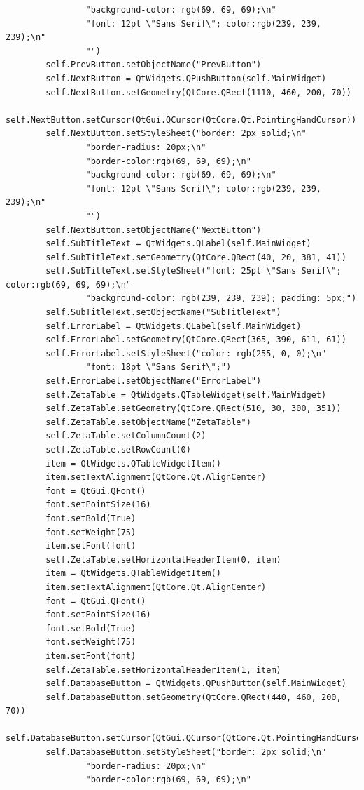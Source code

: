 \documentclass{article}
\begin{document}
\begin{lstlisting}
                "background-color: rgb(69, 69, 69);\n"
                "font: 12pt \"Sans Serif\"; color:rgb(239, 239, 239);\n"
                "")
        self.PrevButton.setObjectName("PrevButton")
        self.NextButton = QtWidgets.QPushButton(self.MainWidget)
        self.NextButton.setGeometry(QtCore.QRect(1110, 460, 200, 70))
        self.NextButton.setCursor(QtGui.QCursor(QtCore.Qt.PointingHandCursor))
        self.NextButton.setStyleSheet("border: 2px solid;\n"
                "border-radius: 20px;\n"
                "border-color:rgb(69, 69, 69);\n"
                "background-color: rgb(69, 69, 69);\n"
                "font: 12pt \"Sans Serif\"; color:rgb(239, 239, 239);\n"
                "")
        self.NextButton.setObjectName("NextButton")
        self.SubTitleText = QtWidgets.QLabel(self.MainWidget)
        self.SubTitleText.setGeometry(QtCore.QRect(40, 20, 381, 41))
        self.SubTitleText.setStyleSheet("font: 25pt \"Sans Serif\"; color:rgb(69, 69, 69);\n"
                "background-color: rgb(239, 239, 239); padding: 5px;")
        self.SubTitleText.setObjectName("SubTitleText")
        self.ErrorLabel = QtWidgets.QLabel(self.MainWidget)
        self.ErrorLabel.setGeometry(QtCore.QRect(365, 390, 611, 61))
        self.ErrorLabel.setStyleSheet("color: rgb(255, 0, 0);\n"
                "font: 18pt \"Sans Serif\";")
        self.ErrorLabel.setObjectName("ErrorLabel")
        self.ZetaTable = QtWidgets.QTableWidget(self.MainWidget)
        self.ZetaTable.setGeometry(QtCore.QRect(510, 30, 300, 351))
        self.ZetaTable.setObjectName("ZetaTable")
        self.ZetaTable.setColumnCount(2)
        self.ZetaTable.setRowCount(0)
        item = QtWidgets.QTableWidgetItem()
        item.setTextAlignment(QtCore.Qt.AlignCenter)
        font = QtGui.QFont()
        font.setPointSize(16)
        font.setBold(True)
        font.setWeight(75)
        item.setFont(font)
        self.ZetaTable.setHorizontalHeaderItem(0, item)
        item = QtWidgets.QTableWidgetItem()
        item.setTextAlignment(QtCore.Qt.AlignCenter)
        font = QtGui.QFont()
        font.setPointSize(16)
        font.setBold(True)
        font.setWeight(75)
        item.setFont(font)
        self.ZetaTable.setHorizontalHeaderItem(1, item)
        self.DatabaseButton = QtWidgets.QPushButton(self.MainWidget)
        self.DatabaseButton.setGeometry(QtCore.QRect(440, 460, 200, 70))
        self.DatabaseButton.setCursor(QtGui.QCursor(QtCore.Qt.PointingHandCursor))
        self.DatabaseButton.setStyleSheet("border: 2px solid;\n"
                "border-radius: 20px;\n"
                "border-color:rgb(69, 69, 69);\n"

\end{lstlisting}
\end{document}
